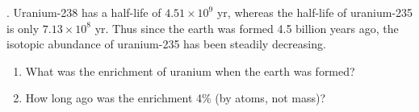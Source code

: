 . Uranium-238 has a half-life of $4.51 \times 10^9$ yr, whereas the half-life of uranium-235 is only $7.13\times10^8$ yr. Thus since the earth
was formed 4.5 billion years ago, the isotopic abundance of
uranium-235 has been steadily decreasing.

\begin{enumerate}[label=(\alph*)]
\item What was the enrichment of uranium when the earth was
formed?
\item How long ago was the enrichment 4\% (by atoms, not mass)?
\end{enumerate}


\vspace{0.5cm}
\ifsolved
